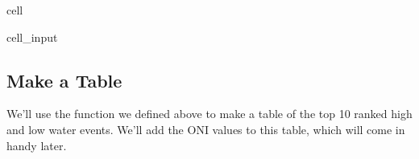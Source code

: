 \documentclass[letterpaper,10pt,english]{jupyterBook}
\begin{document}
\begin{sphinxuseclass}{cell}
\begin{sphinxVerbatimInput}
\begin{sphinxuseclass}{cell_input}
\begin{sphinxVerbatim}[commandchars=\\\{\}]
    \PYG{p}{[}\PYG{p}{]}  \PYG{p}{[}\PYG{p}{]}

     
\end{sphinxVerbatim}

\end{sphinxuseclass}\end{sphinxVerbatimInput}

\end{sphinxuseclass}

\subsection{Make a Table}
\label{\detokenize{notebooks/regional_and_local/SL_Rankings_annual:make-a-table}}
\sphinxAtStartPar
We’ll use the function we defined above to make a table of the top 10 ranked high and low water events. We’ll add the ONI values to this table, which will come in handy later.
\end{document}
